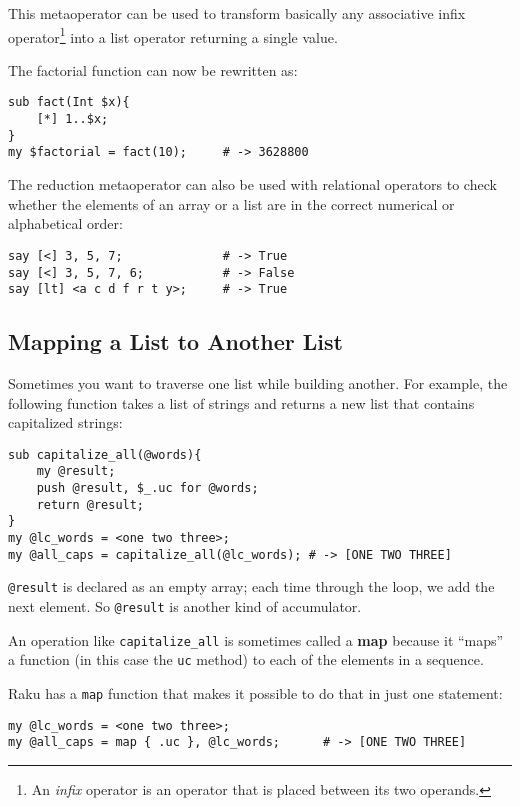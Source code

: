 This metaoperator can be used to transform basically any 
associative infix operator\footnote{An \emph{infix} operator 
is an operator that is placed between its two operands.} 
into a list operator returning a single value.

The factorial function can now be rewritten as:

\begin{verbatim}
sub fact(Int $x){
    [*] 1..$x; 
}
my $factorial = fact(10);     # -> 3628800
\end{verbatim}

The reduction metaoperator can also be used with relational 
operators to check whether the elements of an array or a list 
are in the correct numerical or alphabetical order:

\begin{verbatim}
say [<] 3, 5, 7;              # -> True
say [<] 3, 5, 7, 6;           # -> False
say [lt] <a c d f r t y>;     # -> True
\end{verbatim}

\subsection{Mapping a List to Another List}

Sometimes you want to traverse one list while building
another.  For example, the following function takes a list 
of strings and returns a new list that contains capitalized 
strings:

\begin{verbatim}
sub capitalize_all(@words){
    my @result;
    push @result, $_.uc for @words;
    return @result;
}
my @lc_words = <one two three>;
my @all_caps = capitalize_all(@lc_words); # -> [ONE TWO THREE]
\end{verbatim}
%
\verb'@result' is declared as an empty array; each time through
the loop, we add the next element.  So \verb'@result' is 
another kind of accumulator.

An operation like \verb"capitalize_all" is sometimes called a 
{\bf map} because it ``maps'' a function (in this case the 
{\tt uc} method) to each of the elements in a sequence.

Raku has a {\tt map} function that makes it possible to 
do that in just one statement:

\begin{verbatim}
my @lc_words = <one two three>;
my @all_caps = map { .uc }, @lc_words;      # -> [ONE TWO THREE]
\end{verbatim}
%

